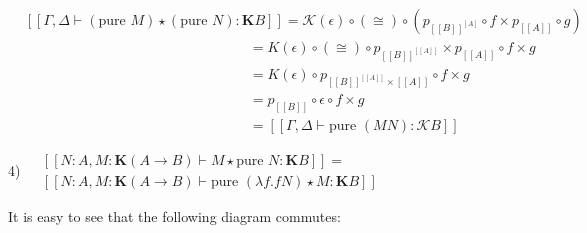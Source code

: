 \documentclass[a4paper]{article}
\begin{document}
$\begin{array}{lll}
&[\![\Gamma, \Delta \vdash (\text{pure } M) \star (\text{pure } N) : \textbf{K}B]\!] =
\mathcal{K}(\epsilon) \circ (\cong) \circ (p_{[\![B]\!]^{\![A]\!}} \circ f \times p_{[\![A]\!]} \circ g) &\\
&\quad\quad\quad\quad\quad\quad\quad\quad\quad\quad\quad\quad\quad\quad\quad\quad = K(\epsilon) \circ (\cong)
\circ p_{{[\![B]\!]^{[\![A]\!]}}} \times p_{[\![A]\!]} \circ f \times g& \\
&\quad\quad\quad\quad\quad\quad\quad\quad\quad\quad\quad\quad\quad\quad\quad\quad = K(\epsilon) \circ
p_{[\![B]\!]^{[\![A]\!]} \times [\![A]\!]} \circ f \times g& \\
&\quad\quad\quad\quad\quad\quad\quad\quad\quad\quad\quad\quad\quad\quad\quad\quad = p_{[\![B]\!]} \circ \epsilon \circ f \times g& \\
&\quad\quad\quad\quad\quad\quad\quad\quad\quad\quad\quad\quad\quad\quad\quad\quad = [\![\Gamma, \Delta \vdash \text{pure } (M N) : \mathcal{K}B]\!]&
\end{array}$

\vspace{\baselineskip}

\newpage

4) $\begin{array}{lll}
&[\![N : A, M : \textbf{K}(A \to B) \vdash M \star \text{pure } N : \textbf{K}B]\!] =&\\
&[\![N : A, M : \textbf{K}(A \to B) \vdash \text{pure } (\lambda f. f N) \star M : \textbf{K}B]\!]&
\end{array}$

\vspace{\baselineskip}

It is easy to see that the following diagram commutes:

\vspace{\baselineskip}

\end{document}
